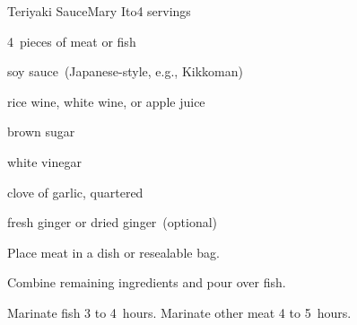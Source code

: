 \begin{recipe}{Teriyaki Sauce}{Mary Ito}{4 servings}

\begin{ingredients}
\item 4~pieces of meat or fish
\item \C{\half} soy sauce~(Japanese-style, e.g., Kikkoman)
\item \C{\third} rice wine, white wine, or apple juice
\item \C{\quarter} brown sugar
\item {} white vinegar
\item clove of garlic, quartered
\item fresh ginger or \tp{\half} dried ginger~(optional)
\end{ingredients}

\begin{directions}
\item Place meat in a dish or resealable bag.
\item Combine remaining ingredients and pour over fish.
\item Marinate fish 3 to 4~hours. Marinate other meat 4 to 5~hours.
\end{directions}

\end{recipe}
